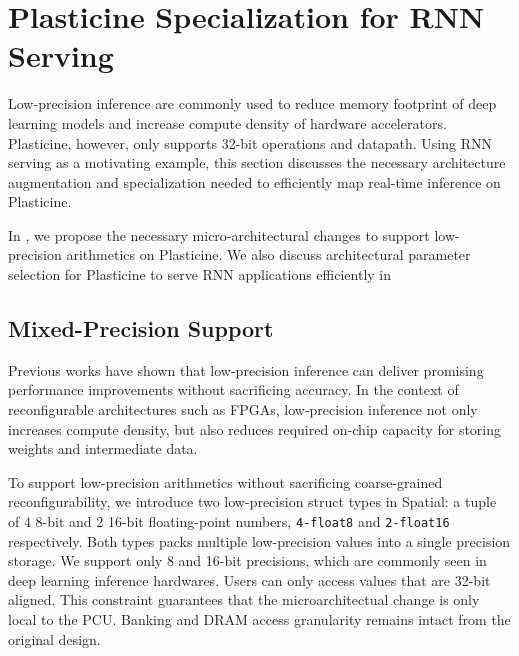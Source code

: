 \section{Plasticine Specialization for RNN Serving} \label{sec:rnn_arch}
Low-precision inference are commonly used to reduce memory footprint of deep learning models and
increase compute density of hardware accelerators.
Plasticine, however, only supports 32-bit operations and datapath.
Using RNN serving as a motivating example, this section discusses the necessary architecture augmentation and
specialization needed to efficiently map real-time inference on Plasticine.

In , we propose the necessary micro-architectural changes to
  support low-precision arithmetics on Plasticine.
We also discuss architectural parameter selection for Plasticine
  to serve RNN applications efficiently in 

\subsection{Mixed-Precision Support} \label{sec:lowprec}
\label{sec:arch:varprec}
Previous works \cite{fowers2018configurable, jouppi2017datacenter}
  have shown that low-precision inference can deliver promising performance
  improvements without sacrificing accuracy.
In the context of reconfigurable architectures such as FPGAs,
  low-precision inference not only increases compute density,
  but also reduces required on-chip capacity for
  storing weights and intermediate data.

To support low-precision arithmetics without sacrificing coarse-grained reconfigurability,
we introduce two low-precision struct types in Spatial: a tuple of 4 8-bit and 2 16-bit floating-point 
numbers, \texttt{4-float8} and \texttt{2-float16} respectively.
Both types packs multiple low-precision values into a single precision storage.
We support only 8 and 16-bit precisions, which are commonly seen in deep learning inference hardwares.
Users can only access values that are 32-bit aligned.
This constraint guarantees that the microarchitectual change is only local to the PCU.
Banking and DRAM access granularity remains intact from the original design.

